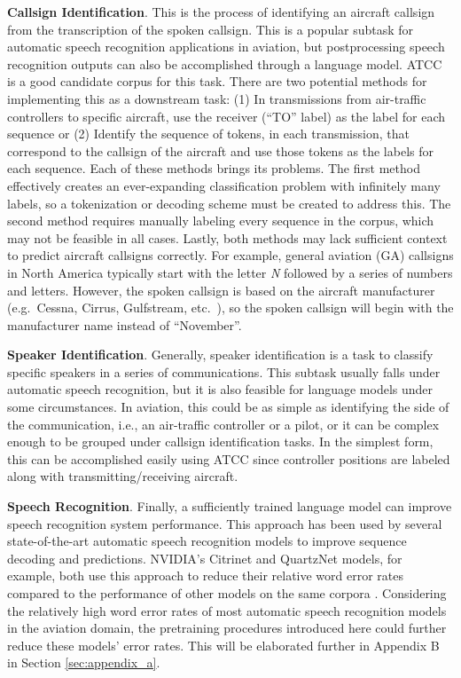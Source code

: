 \documentclass[12pt]{article}
\begin{document}
\textbf{Callsign Identification}. This is the process of identifying an aircraft callsign from the transcription of the spoken callsign. This is a popular subtask for automatic speech recognition applications in aviation, but postprocessing speech recognition outputs can also be accomplished through a language model. ATCC is a good candidate corpus for this task. There are two potential methods for implementing this as a downstream task: (1) In transmissions from air-traffic controllers to specific aircraft, use the receiver (``TO'' label) as the label for each sequence or (2) Identify the sequence of tokens, in each transmission, that correspond to the callsign of the aircraft and use those tokens as the labels for each sequence. Each of these methods brings its problems. The first method effectively creates an ever-expanding classification problem with infinitely many labels, so a tokenization or decoding scheme must be created to address this. The second method requires manually labeling every sequence in the corpus, which may not be feasible in all cases. Lastly, both methods may lack sufficient context to predict aircraft callsigns correctly. For example, general aviation (GA) callsigns in North America typically start with the letter \textit{N} followed by a series of numbers and letters. However, the spoken callsign is based on the aircraft manufacturer (e.g.~Cessna, Cirrus, Gulfstream, etc.~), so the spoken callsign will begin with the manufacturer name instead of ``November''.

\textbf{Speaker Identification}. Generally, speaker identification is a task to classify specific speakers in a series of communications. This subtask usually falls under automatic speech recognition, but it is also feasible for language models under some circumstances. In aviation, this could be as simple as identifying the side of the communication, i.e., an air-traffic controller or a pilot, or it can be complex enough to be grouped under callsign identification tasks. In the simplest form, this can be accomplished easily using ATCC since controller positions are labeled along with transmitting/receiving aircraft.

\textbf{Speech Recognition}. Finally, a sufficiently trained language model can improve speech recognition system performance. This approach has been used by several state-of-the-art automatic speech recognition models to improve sequence decoding and predictions. NVIDIA's Citrinet and QuartzNet models, for example, both use this approach to reduce their relative word error rates compared to the performance of other models on the same corpora \cite{majumdar_citrinet_2021,kriman_quartznet_2020}. Considering the relatively high word error rates of most automatic speech recognition models in the aviation domain, the pretraining procedures introduced here could further reduce these models' error rates. This will be elaborated further in Appendix B in Section \ref{sec:appendix_a}.
\end{document}

